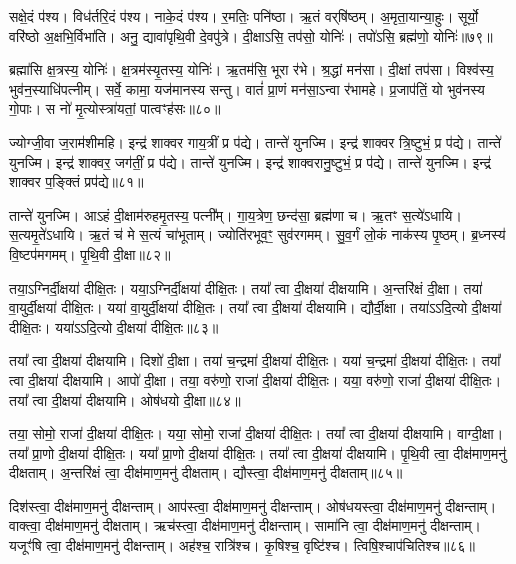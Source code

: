सक्षे॒दं प॑श्य।
विध॑र्तरि॒दं प॑श्य।
नाके॒दं प॑श्य।
र॒मतिः॒ पनि॑ष्ठा।
ऋ॒तं वर्‌\mbox{}षि॑ष्ठम्।
अ॒मृता॒यान्या॒हुः।
सूर्यो॒ वरि॑ष्ठो अ॒क्षभि॒र्विभा॑ति।
अनु॒ द्यावा॑पृथि॒वी दे॒वपु॑त्रे।
दी॒क्षाऽसि॒ तप॑सो॒ योनिः॑।
तपो॑ऽसि॒ ब्रह्म॑णो॒ योनिः॑॥७९॥

ब्रह्मा॑सि क्ष॒त्रस्य॒ योनिः॑।
क्ष॒त्रम॑स्यृ॒तस्य॒ योनिः॑।
ऋ॒तम॑सि॒ भूरा र॑भे।
श्र॒द्धां मन॑सा।
दी॒क्षां तप॑सा।
विश्व॑स्य॒ भुव॑न॒स्याधि॑पत्नीम्।
सर्वे॒ कामा॒ यज॑मानस्य सन्तु।
वातं॑ प्रा॒णं मन॑सा॒\-ऽन्वा र॑भामहे।
प्र॒जाप॑तिं॒ यो भुव॑नस्य गो॒पाः।
स नो॑ मृ॒त्योस्त्रा॑यतां॒ पात्वꣳह॑सः॥८०॥

ज्योग्जी॒वा ज॒राम॑शीमहि।
इन्द्र॑ शाक्वर गाय॒त्रीं प्र प॑द्ये।
तान्ते॑ युनज्मि।
इन्द्र॑ शाक्वर त्रि॒ष्टुभं॒ प्र प॑द्ये।
तान्ते॑ युनज्मि।
इन्द्र॑ शाक्वर॒ जग॑तीं॒ प्र प॑द्ये।
तान्ते॑ युनज्मि।
इन्द्र॑ शाक्वरानु॒ष्टुभं॒ प्र प॑द्ये।
तान्ते॑ युनज्मि।
इन्द्र॑ शाक्वर प॒ङ्क्तिं प्रप॑द्ये॥८१॥

तान्ते॑ युनज्मि।
आऽहं दी॒क्षाम॑रुहमृ॒तस्य॒ पत्नी᳚म्।
गा॒य॒त्रेण॒ छन्द॑सा॒ ब्रह्म॑णा च।
ऋ॒तꣳ स॒त्ये॑\-ऽधायि।
स॒त्यमृ॒ते॑\-ऽधायि।
ऋ॒तं च॑ मे स॒त्यं चा॑भूताम्।
ज्योति॑रभूव॒ꣳ॒ सुव॑रगमम्।
सु॒व॒र्गं लो॒कं नाक॑स्य पृ॒ष्ठम्।
ब्र॒ध्नस्य॑ वि॒ष्टप॑मगमम्।
पृ॒थि॒वी दी॒क्षा॥८२॥

तया॒ऽग्निर्दी॒क्षया॑ दीक्षि॒तः।
यया॒ऽग्निर्दी॒क्षया॑ दीक्षि॒तः।
तया᳚ त्वा दी॒क्षया॑ दीक्षयामि।
अ॒न्तरि॑क्षं दी॒क्षा।
तया॑ वा॒युर्दी॒क्षया॑ दीक्षि॒तः।
यया॑ वा॒युर्दी॒क्षया॑ दीक्षि॒तः।
तया᳚ त्वा दी॒क्षया॑ दीक्षयामि।
द्यौर्दी॒क्षा।
तया॑ऽऽदि॒त्यो दी॒क्षया॑ दीक्षि॒तः।
यया॑ऽऽदि॒त्यो दी॒क्षया॑ दीक्षि॒तः॥८३॥

तया᳚ त्वा दी॒क्षया॑ दीक्षयामि।
दिशो॑ दी॒क्षा।
तया॑ च॒न्द्रमा॑ दी॒क्षया॑ दीक्षि॒तः।
यया॑ च॒न्द्रमा॑ दी॒क्षया॑ दीक्षि॒तः।
तया᳚ त्वा दी॒क्षया॑ दीक्षयामि।
आपो॑ दी॒क्षा।
तया॒ वरु॑णो॒ राजा॑ दी॒क्षया॑ दीक्षि॒तः।
यया॒ वरु॑णो॒ राजा॑ दी॒क्षया॑ दीक्षि॒तः।
तया᳚ त्वा दी॒क्षया॑ दीक्षयामि।
ओष॑धयो दी॒क्षा॥८४॥

तया॒ सोमो॒ राजा॑ दी॒क्षया॑ दीक्षि॒तः।
यया॒ सोमो॒ राजा॑ दी॒क्षया॑ दीक्षि॒तः।
तया᳚ त्वा दी॒क्षया॑ दीक्षयामि।
वाग्दी॒क्षा।
तया᳚ प्रा॒णो दी॒क्षया॑ दीक्षि॒तः।
यया᳚ प्रा॒णो दी॒क्षया॑ दीक्षि॒तः।
तया᳚ त्वा दी॒क्षया॑ दीक्षयामि।
पृ॒थि॒वी त्वा॒ दीक्ष॑माण॒मनु॑ दीक्षताम्।
अ॒न्तरि॑क्षं त्वा॒ दीक्ष॑माण॒मनु॑ दीक्षताम्।
द्यौस्त्वा॒ दीक्ष॑माण॒मनु॑ दीक्षताम्॥८५॥

दिश॑स्त्वा॒ दीक्ष॑माण॒मनु॑ दीक्षन्ताम्।
आप॑स्त्वा॒ दीक्ष॑माण॒मनु॑ दीक्षन्ताम्।
ओष॑धयस्त्वा॒ दीक्ष॑माण॒मनु॑ दीक्षन्ताम्।
वाक्त्वा॒ दीक्ष॑माण॒मनु॑ दीक्षताम्।
ऋच॑स्त्वा॒ दीक्ष॑माण॒मनु॑ दीक्षन्ताम्।
सामा॑नि त्वा॒ दीक्ष॑माण॒मनु॑ दीक्षन्ताम्।
यजूꣳ॑षि त्वा॒ दीक्ष॑माण॒मनु॑ दीक्षन्ताम्।
अह॑श्च॒ रात्रि॑श्च।
कृ॒षिश्च॒ वृष्टि॑श्च।
त्विषि॒श्चाप॑चितिश्च॥८६॥

